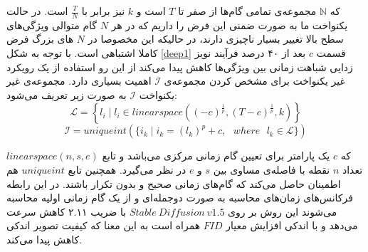 که $\mathbb{N}$ مجموعه‌ی تمامی گام‌ها از صفر تا $T$ است و $k$ نیز برابر با $\frac T N$ است. در حالت یکنواخت ما به صورت ضمنی این فرض را داریم که در هر $N$ گام متوالی ویژگی‌های سطح بالا تغییر بسیار ناچیزی دارند، در حالیکه این مخصوصا در $N$ های بزرگ فرض کاملا اشتباهی است. با توجه به شکل \ref{deep1} قسمت $c$ بعد از ۴۰ درصد فرآیند نویز زدایی شباهت زمانی بین ویژگی‌ها کاهش پیدا می‌کند از این رو استفاده از یک رویکرد غیر یکنواخت برای مشخص کردن مجموعه‌ی $\mathcal{I}$  اهمیت بسیاری دارد. مجموعه‌ی غیر یکنواخت $\mathcal{I}$  به صورت زیر تعریف می‌شود:
\begin{equation}
	\mathcal{L} = \left\{l_{i} \mid l_{i} \in \mbox{$linear space$}\left((-c)^{\frac{1}{p}}, (T - c)^{\frac{1}{p}}, k\right)\right\}
\end{equation}
\begin{equation}
	\mathcal{I} = \mbox{$unique int$}\left(\{i_{k} \mid i_{k} = (l_{k})^{p} + c, \mbox{ $where$ } l_{k} \in \mathcal{L}\}\right)
\end{equation}

که $c$ یک پارامتر برای تعیین گام زمانی مرکزی می‌باشد و تابع $linear space(n, s, e)$ تعداد $n$ نقطه با فاصله‌ی مساوی بین $s$ و $e$  در نظر می‌گیرد. همچنین تابع $unique int$ هم اطمینان حاصل می‌کند که گام‌های زمانی صحیح و بدون تکرار باشند. در این رابطه فرکانس‌های زمان‌های محاسبه به صورت دوجمله‌ای و از یک گام زمانی اولیه محاسبه می‌شوند
این روش بر روی $Stable\ Diffusion\ v1.5$  با ضریب ۲.۱۱ کاهش سرعت می‌دهد و با اندکی افزایش معیار $FID$ همراه است به این معنا که کیفیت تصویر اندکی کاهش پیدا می‌کند.


